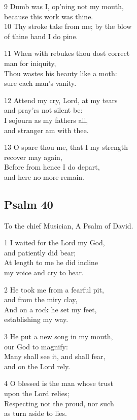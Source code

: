 9 Dumb was I, op’ning not my mouth,\\
because this work was thine.\\
10 Thy stroke take from me; by the blow\\
of thine hand I do pine.

11 When with rebukes thou dost correct\\
man for iniquity,\\
Thou wastes his beauty like a moth:\\
sure each man’s vanity.

12 Attend my cry, Lord, at my tears\\
and pray’rs not silent be:\\
I sojourn as my fathers all,\\
and stranger am with thee.

13 O spare thou me, that I my strength\\
recover may again,\\
Before from hence I do depart,\\
and here no more remain.

\begin{center}
\quad{}\quad{}
\end{center}

\subsection*{Psalm 40}

To the chief Musician,
A Psalm of David.

1 I waited for the Lord my God,\\
and patiently did bear;\\
At length to me he did incline\\
my voice and cry to hear.

2 He took me from a fearful pit,\\
and from the miry clay,\\
And on a rock he set my feet,\\
establishing my way.

3 He put a new song in my mouth,\\
our God to magnify:\\
Many shall see it, and shall fear,\\
and on the Lord rely.

4 O blessed is the man whose trust\\
upon the Lord relies;\\
Respecting not the proud, nor such\\
as turn aside to lies.

